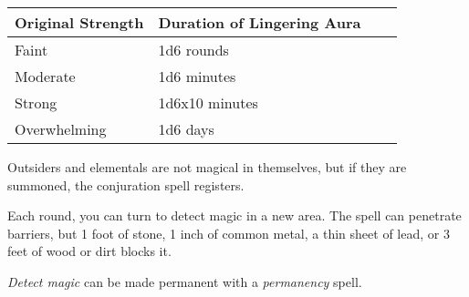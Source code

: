 \begin{longtable}{llll}
\hline
\multicolumn{1}{|p{1.203in}|}{\begin{minipage}[t]{1.203in}\raggedright
\textbf{Original Strength}\end{minipage}} & \multicolumn{1}{p{1.806in}|}{\begin{minipage}[t]{1.806in}\raggedright
\textbf{Duration of Lingering Aura}\end{minipage}}\\
\hline
\multicolumn{1}{p{0.069in}|}{\begin{minipage}[t]{0.069in}\raggedright
Faint\end{minipage}} & \multicolumn{1}{p{0.069in}|}{\begin{minipage}[t]{0.069in}\raggedright
1d6 rounds\end{minipage}}\\
\hline
\multicolumn{1}{|p{1.203in}|}{\begin{minipage}[t]{1.203in}\raggedright
Moderate\end{minipage}} & \multicolumn{1}{p{1.806in}|}{\begin{minipage}[t]{1.806in}\raggedright
1d6 minutes\end{minipage}}\\
\hline
\multicolumn{1}{p{0.069in}|}{\begin{minipage}[t]{0.069in}\raggedright
Strong\end{minipage}} & \multicolumn{1}{p{0.069in}|}{\begin{minipage}[t]{0.069in}\raggedright
1d6x10 minutes\end{minipage}}\\
\hline
\multicolumn{1}{|p{1.203in}|}{\begin{minipage}[t]{1.203in}\raggedright
Overwhelming\end{minipage}} & \multicolumn{3}{p{1.944in}|}{\begin{minipage}[t]{1.944in}\raggedright
1d6 days\end{minipage}}\\
\hline
\end{longtable}

Outsiders and elementals are not magical in themselves, but if they are summoned, 
the conjuration spell registers.

Each round, you can turn to detect magic in a new area. The spell can penetrate 
barriers, but 1 foot of stone, 1 inch of common metal, a thin sheet of lead, or 
3 feet of wood or dirt blocks it.

\textit{Detect magic} can be made permanent with a \textit{permanency} spell.

